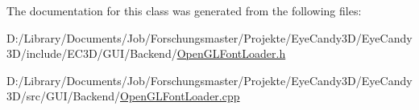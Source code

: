 The documentation for this class was generated from the following files\+:\begin{DoxyCompactItemize}
\item 
D\+:/\+Library/\+Documents/\+Job/\+Forschungsmaster/\+Projekte/\+Eye\+Candy3\+D/\+Eye\+Candy3\+D/include/\+E\+C3\+D/\+G\+U\+I/\+Backend/\mbox{\hyperlink{_open_g_l_font_loader_8h}{Open\+G\+L\+Font\+Loader.\+h}}\item 
D\+:/\+Library/\+Documents/\+Job/\+Forschungsmaster/\+Projekte/\+Eye\+Candy3\+D/\+Eye\+Candy3\+D/src/\+G\+U\+I/\+Backend/\mbox{\hyperlink{_open_g_l_font_loader_8cpp}{Open\+G\+L\+Font\+Loader.\+cpp}}\end{DoxyCompactItemize}
